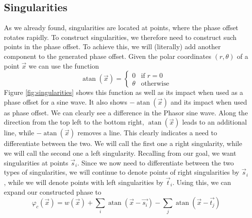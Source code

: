 \documentclass{utue} %
\DeclareMathOperator{\atan}{atan}
\begin{document}
\subsection{Singularities}\label{sec:singularities}
As we already found, singularities are located at points, where the phase offset rotates rapidly. To construct singularities, we therefore need to construct such points in the phase offset. To achieve this, we will (literally) add another component to the generated phase offset. Given the polar coordinates $(r, \theta)$ of a point $\vec{x}$ we can use the function
$$
\atan(\vec{x}) = \begin{cases}
  0 & \text{if } r = 0\\
  \theta &\text{otherwise}
\end{cases}
$$
Figure \ref{fig:singularities} shows this function as well as its impact when used as a phase offset for a sine wave. It also shows $-\atan(\vec{x})$ and its impact when used as phase offset. We can clearly see a difference in the Phasor sine wave. Along the direction from the top left to the bottom right, $\atan(\vec{x})$ leads to an additional line, while $-\atan(\vec{x})$ removes a line. This clearly indicates a need to differentiate between the two. We will call the first one a right singularity, while we will call the second one a left singularity. Recalling from our goal, we want singularities at points $\vec{s}_i$. Since we now need to differentiate between the two types of singularities, we will continue to denote points of right singularities by $\vec{s}_i$, while we will denote points with left singularities by $\vec{t}_i$. Using this, we can expand our constructed phase to
$$
\varphi_c(\vec{x}) = w(\vec{x}) + \sum_i \atan(\vec{x}-\vec{s_i}) - \sum_j \atan(\vec{x}-\vec{t_j})
$$
\end{document}
